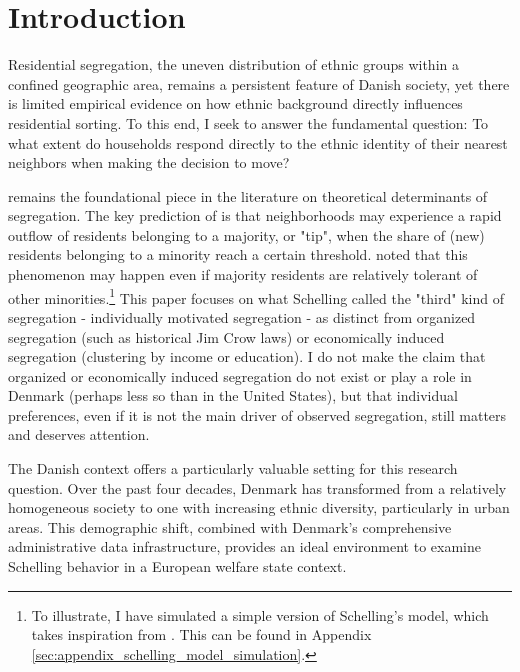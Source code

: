 \documentclass[../main.tex]{subfiles}
\begin{document}
\section{Introduction}

Residential segregation, the uneven distribution of ethnic groups within a confined geographic area, remains a persistent feature of Danish society, yet there is limited empirical evidence on how ethnic background directly influences residential sorting. To this end, I seek to answer the fundamental question: To what extent do households respond directly to the ethnic identity of their nearest neighbors when making the decision to move?

\textcite{schelling1971dynamic} remains the foundational piece in the literature on theoretical determinants of segregation. The key prediction of \textcite{schelling1971dynamic} is that neighborhoods may experience a rapid outflow of residents belonging to a majority, or "tip", when the share of (new) residents belonging to a minority reach a certain threshold. \textcite{schelling1971dynamic} noted that this phenomenon may happen even if majority residents are relatively tolerant of other minorities.\footnote{To illustrate, I have simulated a simple version of Schelling's model, which takes inspiration from \textcite{luca_mingarelli}. This can be found in Appendix \ref{sec:appendix_schelling_model_simulation}.} This paper focuses on what Schelling called the "third" kind of segregation - individually motivated segregation - as distinct from organized segregation (such as historical Jim Crow laws) or economically induced segregation (clustering by income or education).  I do not make the claim that organized or economically induced segregation do not exist or play a role in Denmark (perhaps less so than in the United States), but that individual preferences, even if it is not the main driver of observed segregation, still matters and deserves attention. 

The Danish context offers a particularly valuable setting for this research question. Over the past four decades, Denmark has transformed from a relatively homogeneous society to one with increasing ethnic diversity, particularly in urban areas. This demographic shift, combined with Denmark's comprehensive administrative data infrastructure, provides an ideal environment to examine Schelling behavior in a European welfare state context.
\end{document}
